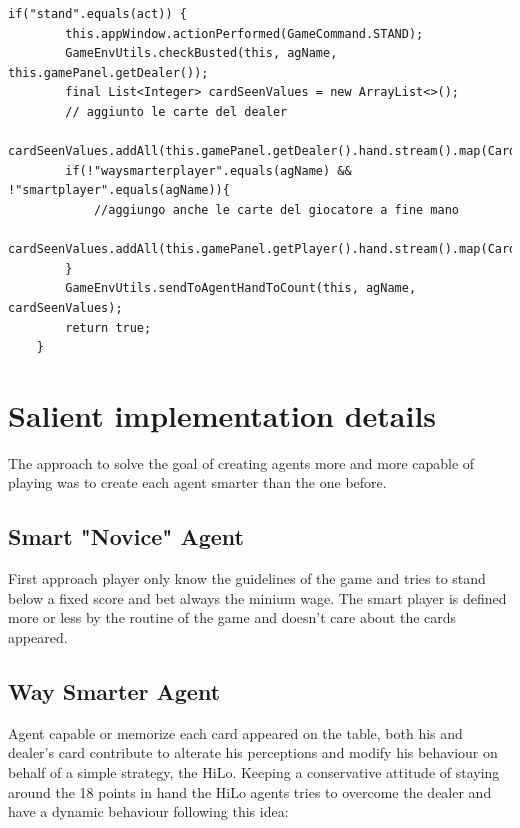 \begin{lstlisting}[style=java, caption=Java implementation of different behaviour based on specifc agent, label=lst:java_stand_action]
    if("stand".equals(act)) {
        this.appWindow.actionPerformed(GameCommand.STAND);
        GameEnvUtils.checkBusted(this, agName, this.gamePanel.getDealer());
        final List<Integer> cardSeenValues = new ArrayList<>();
        // aggiunto le carte del dealer
        cardSeenValues.addAll(this.gamePanel.getDealer().hand.stream().map(Card::getValue).collect(Collectors.toList()));
        if(!"waysmarterplayer".equals(agName) && !"smartplayer".equals(agName)){
            //aggiungo anche le carte del giocatore a fine mano
            cardSeenValues.addAll(this.gamePanel.getPlayer().hand.stream().map(Card::getValue).collect(Collectors.toList()));
        }
        GameEnvUtils.sendToAgentHandToCount(this, agName, cardSeenValues);
        return true;
    }
\end{lstlisting}


\chapter{Salient implementation details}

The approach to solve the goal of creating agents more and more capable of playing was to create each agent smarter than the one before.

\section{Smart "Novice" Agent}
First approach player only know the guidelines of the game and tries to stand below a fixed score and bet always the minium wage. The smart player is defined more or less by the routine of the game and doesn't care about the cards appeared.

\section{Way Smarter Agent}
Agent capable or memorize each card appeared on the table, both his and dealer's card contribute to alterate his perceptions and modify his behaviour on behalf of a simple strategy, the HiLo.
Keeping a conservative attitude of staying around the 18 points in hand the HiLo agents tries to overcome the dealer and have a dynamic behaviour following this idea:

